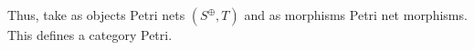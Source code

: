 %
%
Thus, take as objects Petri nets $(S^\oplus, T)$ and as morphisms Petri net morphisms. This defines a category Petri.
